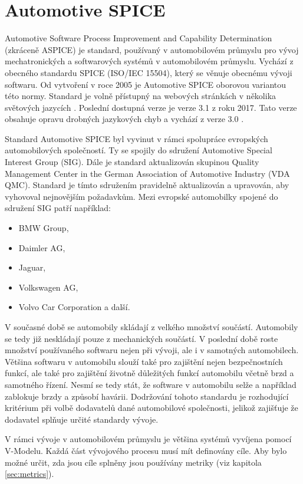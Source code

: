 \documentclass[czech,master,public,dept460,male,cpdeclaration,oneside]{diploma}
\begin{document}
\section{Automotive SPICE}
\label{sec:aspice}
Automotive Software Process Improvement and Capability Determination (zkráceně ASPICE) je standard, používaný v automobilovém průmyslu pro vývoj mechatronických a softwarových systémů v automobilovém průmyslu. Vychází z obecného standardu SPICE (ISO/IEC 15504), který se věnuje obecnému vývoji softwaru. Od vytvoření v roce 2005 je Automotive SPICE oborovou variantou této normy. Standard je volně přístupný na webových stránkách v několika světových jazycích \cite{ref:aspice_download_obecne}. Poslední dostupná verze je verze 3.1 z roku 2017. Tato verze obsahuje opravu drobných jazykových chyb a vychází z verze 3.0 \cite{ref:aspice_download_verze}.

Standard Automotive SPICE byl vyvinut v rámci spolupráce evropských automobilových společností. Ty se spojily do sdružení Automotive Special Interest Group (SIG). Dále je standard aktualizován skupinou Quality Management Center in the German Association of Automotive Industry (VDA QMC). Standard je tímto sdružením pravidelně aktualizován a upravován, aby vyhovoval nejnovějším požadavkům. Mezi evropské automobilky spojené do sdružení SIG patří například:

\begin{itemize}
  \item BMW Group,
  \item Daimler AG,
  \item Jaguar,
  \item Volkswagen AG,
  \item Volvo Car Corporation a další.
\end{itemize}

V současné době se automobily skládají z velkého množství součástí. Automobily se tedy již neskládají pouze z mechanických součástí. V poslední době roste množství používaného softwaru nejen při vývoji, ale i v samotných automobilech. Většina softwaru v automobilu slouží také pro zajištění nejen bezpečnostních funkcí, ale také pro zajištění životně důležitých funkcí automobilu včetně brzd a samotného řízení. Nesmí se tedy stát, že software v automobilu selže a například zablokuje brzdy a způsobí havárii. Dodržování tohoto standardu je rozhodující kritérium při volbě dodavatelů dané automobilové společnosti, jelikož zajišťuje že dodavatel splňuje určité standardy vývoje.

V rámci vývoje v automobilovém průmyslu je většina systémů vyvíjena pomocí V-Modelu. Každá část  vývojového procesu musí mít definovány cíle. Aby bylo možné určit, zda jsou cíle splněny jsou používány metriky (viz kapitola \ref{sec:metrics}). 
\end{document}
